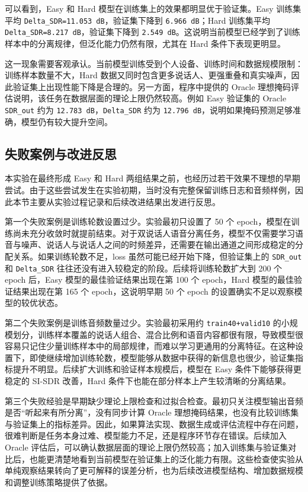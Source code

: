 可以看到，Easy 和 Hard 模型在训练集上的效果都明显优于验证集。Easy 训练集平均 \texttt{Delta\_SDR=11.053 dB}，验证集下降到 \texttt{6.966 dB}；Hard 训练集平均 \texttt{Delta\_SDR=8.217 dB}，验证集下降到 \texttt{2.549 dB}。这说明当前模型已经学到了训练样本中的分离规律，但泛化能力仍然有限，尤其在 Hard 条件下表现更明显。

这一现象需要客观承认。当前模型训练受到个人设备、训练时间和数据规模限制：训练样本数量不大，Hard 数据又同时包含更多说话人、更强重叠和真实噪声，因此验证集上出现性能下降是合理的。另一方面，程序中提供的 Oracle 理想掩码评估说明，该任务在数据层面的理论上限仍然较高。例如 Easy 验证集的 Oracle \texttt{SDR\_out} 约为 \texttt{12.783 dB}，\texttt{Delta\_SDR} 约为 \texttt{12.796 dB}，说明如果掩码预测足够准确，模型仍有较大提升空间。

\subsection{失败案例与改进反思}

本实验在最终形成 Easy 和 Hard 两组结果之前，也经历过若干效果不理想的早期尝试。由于这些尝试发生在实验初期，当时没有完整保留训练日志和音频样例，因此本节主要从实验过程记录和后续改进结果出发进行反思。

第一个失败案例是训练轮数设置过少。实验最初只设置了 50 个 epoch，模型在训练尚未充分收敛时就提前结束。对于双说话人语音分离任务，模型不仅需要学习语音与噪声、说话人与说话人之间的时频差异，还需要在输出通道之间形成稳定的分配关系。如果训练轮数不足，loss 虽然可能已经开始下降，但验证集上的 \texttt{SDR\_out} 和 \texttt{Delta\_SDR} 往往还没有进入较稳定的阶段。后续将训练轮数扩大到 200 个 epoch 后，Easy 模型的最佳验证结果出现在第 100 个 epoch，Hard 模型的最佳验证结果出现在第 165 个 epoch，这说明早期 50 个 epoch 的设置确实不足以观察模型的较优状态。

第二个失败案例是训练音频数量过少。实验最初采用约 \texttt{train40+valid10} 的小规模划分，训练样本覆盖的说话人组合、混合比例和语音内容都很有限，导致模型很容易只记住少量训练样本中的局部规律，而难以学习更通用的分离特征。在这种设置下，即使继续增加训练轮数，模型能够从数据中获得的新信息也很少，验证集指标提升不明显。后续扩大训练和验证样本规模后，模型在 Easy 条件下能够获得更稳定的 SI-SDR 改善，Hard 条件下也能在部分样本上产生较清晰的分离结果。

第三个失败经验是早期缺少理论上限检查和过拟合检查。最初只关注模型输出音频是否“听起来有所分离”，没有同步计算 Oracle 理想掩码结果，也没有比较训练集与验证集上的指标差异。因此，如果算法实现、数据生成或评估流程中存在问题，很难判断是任务本身过难、模型能力不足，还是程序环节存在错误。后续加入 Oracle 评估后，可以确认数据层面的理论上限仍然较高；加入训练集与验证集对比后，也能更清楚地看到当前模型在验证集上的泛化能力有限。这些检查使实验从单纯观察结果转向了更可解释的误差分析，也为后续改进模型结构、增加数据规模和调整训练策略提供了依据。

